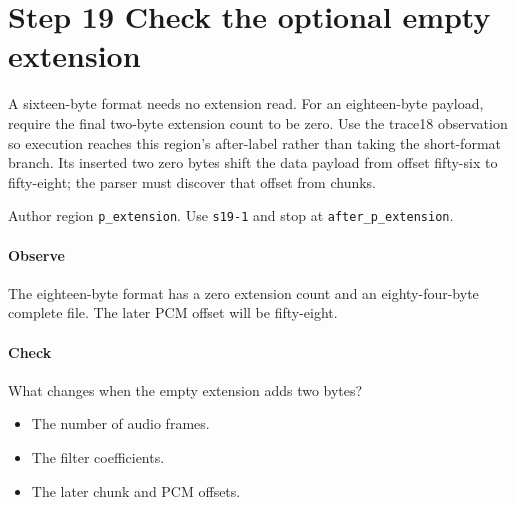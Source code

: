 \section{Step 19 Check the optional empty extension}\label{pcm-wav-s19}
A sixteen-byte format needs no extension read. For an eighteen-byte payload, require the final two-byte extension count to be zero. Use the trace18 observation so execution reaches this region's after-label rather than taking the short-format branch. Its inserted two zero bytes shift the data payload from offset fifty-six to fifty-eight; the parser must discover that offset from chunks.

Author region \texttt{p\_extension}. Use \texttt{s19-1} and stop at \texttt{after\_p\_extension}.

\paragraph{Observe} The eighteen-byte format has a zero extension count and an eighty-four-byte complete file. The later PCM offset will be fifty-eight.

\paragraph{Check} What changes when the empty extension adds two bytes?
\begin{itemize}
\item[A.] The number of audio frames.
\item[B.] The filter coefficients.
\item[C.] The later chunk and PCM offsets.
\end{itemize}
